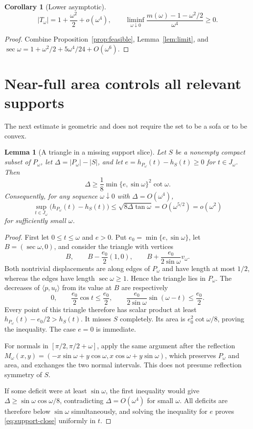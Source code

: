 \documentclass[11pt]{article}
\newtheorem{lemma}[theorem]{Lemma}
\newtheorem{corollary}[theorem]{Corollary}
\theoremstyle{remark}\newtheorem{remark}[theorem]{Remark}
\newcommand{\area}[1]{\lvert #1\rvert}
\newcommand{\ip}[2]{\langle #1,#2\rangle}
\begin{document}
\begin{corollary}[Lower asymptotic]\label{cor:lower}
\[
 \area{T_\omega}=1+\frac{\omega^2}{2}+o(\omega^4),\qquad
 \liminf_{\omega\downarrow0}\frac{m(\omega)-1-\omega^2/2}{\omega^4}\ge0.
\]
\end{corollary}
\begin{proof}
Combine Proposition~\ref{prop:feasible}, Lemma~\ref{lem:limit}, and
$\sec\omega=1+\omega^2/2+5\omega^4/24+O(\omega^6)$.
\end{proof}

\section{Near-full area controls all relevant supports}
The next estimate is geometric and does not require the set to be a sofa or to be convex.

\begin{lemma}[A triangle in a missing support slice]\label{lem:slice}
Let $S$ be a nonempty compact subset of $P_\omega$, let $\Delta=\area{P_\omega}-\area S$, and let
$e=h_{P_\omega}(t)-h_S(t)\ge0$ for $t\in J_\omega$. Then
\[
 \Delta\ge\frac18\min\{e,\sin\omega\}^2\cot\omega.
\]
Consequently, for any sequence $\omega\downarrow0$ with $\Delta=O(\omega^4)$,
\begin{equation}\label{eq:support-close}
 \sup_{t\in J_\omega}\bigl(h_{P_\omega}(t)-h_S(t)\bigr)
 \le\sqrt{8\Delta\tan\omega}=O(\omega^{5/2})=o(\omega^2)
\end{equation}
for sufficiently small $\omega$.
\end{lemma}
\begin{proof}
First let $0\le t\le\omega$ and $e>0$. Put $e_0=\min\{e,\sin\omega\}$, let $B=(\sec\omega,0)$, and consider the triangle with vertices
\[
 B,\qquad B-\frac{e_0}{2}(1,0),\qquad B+\frac{e_0}{2\sin\omega}v_\omega.
\]
Both nontrivial displacements are along edges of $P_\omega$ and have length at most $1/2$, whereas the edges have length $\sec\omega\ge1$. Hence the triangle lies in $P_\omega$. The decreases of $\ip p{u_t}$ from its value at $B$ are respectively
\[
 0,\qquad \frac{e_0}{2}\cos t\le\frac{e_0}{2},\qquad
 \frac{e_0}{2\sin\omega}\sin(\omega-t)\le\frac{e_0}{2}.
\]
Every point of this triangle therefore has scalar product at least $h_{P_\omega}(t)-e_0/2>h_S(t)$. It misses $S$ completely. Its area is $e_0^2\cot\omega/8$, proving the inequality. The case $e=0$ is immediate.

For normals in $[\pi/2,\pi/2+\omega]$, apply the same argument after the reflection
$M_\omega(x,y)=(-x\sin\omega+y\cos\omega,x\cos\omega+y\sin\omega)$, which preserves $P_\omega$ and area, and exchanges the two normal intervals. This does not presume reflection symmetry of $S$.

If some deficit were at least $\sin\omega$, the first inequality would give $\Delta\ge\sin\omega\cos\omega/8$, contradicting $\Delta=O(\omega^4)$ for small $\omega$. All deficits are therefore below $\sin\omega$ simultaneously, and solving the inequality for $e$ proves \eqref{eq:support-close} uniformly in $t$.
\end{proof}
\end{document}

